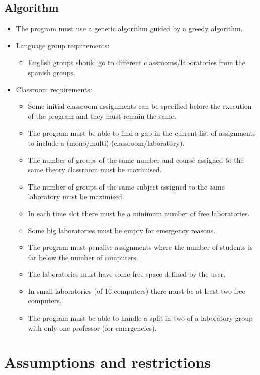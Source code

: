 \subsection{Algorithm}

\begin{itemize}
    \item The program must use a genetic algorithm guided by a greedy algorithm.
    \item Language group requirements:
        \begin{itemize}
            \item English groups should go to different classrooms/laboratories from the spanish groups.
        \end{itemize}
    \item Classroom requirements:
        \begin{itemize}
            \item Some initial classroom assignments can be specified before the execution of the program and they must remain the same.
            \item The program must be able to find a gap in the current list of assignments to include a (mono/multi)-(classroom/laboratory).
            \item The number of groups of the same number and course assigned to the same theory classroom must be maximised.
            \item The number of groups of the same subject assigned to the same laboratory must be maximised.
            \item In each time slot there must be a minimum number of free laboratories.
            \item Some big laboratories must be empty for emergency reasons.
            \item The program must penalise assignments where the number of students is far below the number of computers.
            \item The laboratories must have some free space defined by the user.
            \item In small laboratories (of 16 computers) there must be at least two free computers.
            \item The program must be able to handle a split in two of a laboratory group with only one professor (for emergencies).
        \end{itemize}
\end{itemize}

\section{Assumptions and restrictions}

